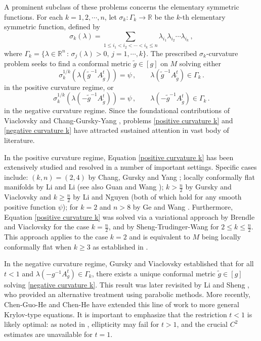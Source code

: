 \documentclass{article}
\theoremstyle{plain}
\theoremstyle{definition}
\theoremstyle{definition}
\numberwithin{equation}{section}
\begin{document}
\begin{sloppypar}
A prominent subclass of these problems concerns the elementary symmetric functions. For each $k=1,2,\cdots,n$, let $\sigma_k:\Gamma_{k}\rightarrow \mathbb{R}$ be the $k$-th elementary symmetric function, defined by
\[
\sigma_{k}(\lambda)=\sum_{1 \leq i_1 < i_2 < \cdots < i_{k} \leq n}  \lambda_{i_1} \lambda_{i_2}  \cdots \lambda_{i_k}\,,
\]
where $\Gamma_{k}=\{\lambda\in \mathbb{R}^n\, :\, \sigma_{j}(\lambda)>0, \, j=1,\cdots,k\}.$  The prescribed $\sigma_k$-curvature problem seeks to find a conformal metric $\tilde{g} \in [g]$ on $M$ solving either
\begin{equation}\label{positive curvature k}
\sigma_{k}^{1/k}(\lambda(\tilde{g}^{-1}A^{t}_{\tilde{g}}))=\psi\,, \qquad \lambda(\tilde{g}^{-1}A^{t}_{\tilde{g}})\in \Gamma_{k}\,.
\end{equation}
in the positive curvature regime, or 
\begin{equation}\label{negative curvature k}
\sigma_{k}^{1/k}(\lambda(-\tilde{g}^{-1}A^{t}_{\tilde{g}}))=\psi\,, \qquad \lambda(-\tilde{g}^{-1}A^{t}_{\tilde{g}})\in \Gamma_{k}\,.
\end{equation}
in the negative curvature regime. Since the foundational contributions of Viaclovsky \cite{Via00a} and Chang-Gursky-Yang \cite{CGY02a}, problems \eqref{positive curvature k} and \eqref{negative curvature k} have attracted sustained attention  in vast body of literature. \medskip


In the positive curvature regime, Equation \eqref{positive curvature k} has been extensively studied and resolved in a number of important settings.  Specific cases include:  $(k,n)=(2,4)$ by Chang, Gursky and Yang \cite{CGY02a,CGY02b}; locally conformally flat manifolds by Li and Li \cite{LL03} (see also Guan and Wang \cite{GW03});  $k>\frac{n}{2}$ by Gursky and Viaclovsky \cite{GV07} and $k\geq \frac{n}{2}$ by Li and Nguyen \cite{LN14} (both of which hold for any smooth positive function $\psi$); for $k=2$ and $n>8$ by Ge and Wang \cite{GW06}. Furthermore, Equation \eqref{positive curvature k} was solved via a variational approach by Brendle and Viaclovsky \cite{BV04} for the case $k = \frac{n}{2}$, and by Sheng-Trudinger-Wang \cite{STW13} for $2 \leq k \leq \frac{n}{2}$. This approach applies to the case $k=2$ and is equivalent to $M$ being locally conformally flat when $k \geq 3$ as established in \cite{BG08}. \medskip

In the negative curvature regime, Gursky and Viaclovsky \cite{GV03} established that for all $t < 1$ and $\lambda(-g^{-1}A_{g}^{t}) \in \Gamma_{k}$, there exists a unique conformal metric $\tilde{g} \in [g]$ solving  \eqref{negative curvature k}. This result was later revisited by Li and Sheng \cite{LS05}, who provided an alternative treatment using parabolic methods. More recently,  Chen-Guo-He \cite{CGH22} and Chen-He \cite{CH24} have extended this line of work to more general Krylov-type equations. It is important to emphasize that the restriction $t < 1$ is likely optimal: as noted in \cite{Via00b}, ellipticity may fail for $t > 1$, and the crucial $C^2$ estimates are unavailable for $t = 1$. \medskip


\end{sloppypar}
\end{document}

